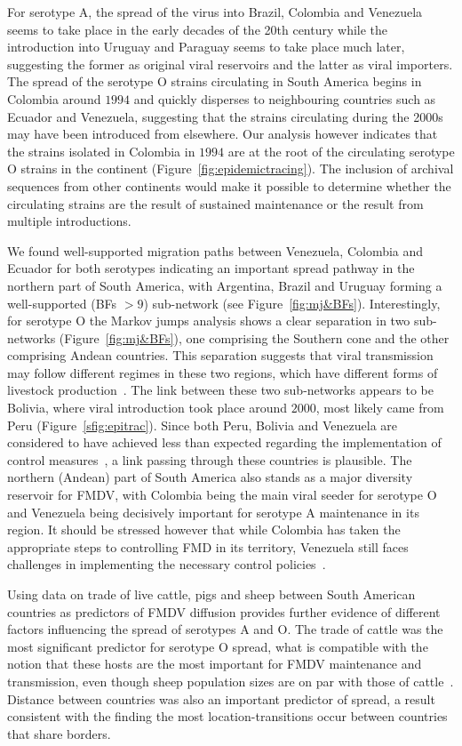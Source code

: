 \documentclass[10pt]{article}
\begin{document}
For serotype A, the spread of the virus into  Brazil, Colombia and Venezuela seems to take place in the early decades of the 20th century while the introduction into Uruguay and Paraguay seems to take place much later, suggesting the former as original viral reservoirs and the latter as viral importers.
The spread of the serotype O strains  circulating in South America begins in Colombia around $1994$ and quickly disperses to neighbouring countries such as Ecuador and Venezuela, suggesting that the strains circulating during the 2000s may have been introduced from elsewhere.
Our analysis however indicates that the strains isolated in Colombia in $1994$ are at the root of the circulating serotype O strains in the continent (Figure~\ref{fig:epidemictracing}).
The inclusion of archival sequences from other continents would make it possible to determine whether the circulating strains are the result of sustained maintenance or the result from multiple introductions. 

We found well-supported migration paths between Venezuela, Colombia and Ecuador for both serotypes indicating an important spread pathway in the northern part of South America, with Argentina, Brazil and Uruguay forming a well-supported (BFs $> 9$) sub-network (see Figure~\ref{fig:mj&BFs}).
Interestingly, for serotype O the Markov jumps analysis shows a clear separation in two sub-networks (Figure~\ref{fig:mj&BFs}), one comprising the Southern cone and the other comprising Andean countries.
This separation suggests that viral transmission may follow different regimes in these two regions, which have different forms of livestock production~\cite{Saraiva2003,Naranjo2013}.
The link between these two sub-networks appears to be Bolivia, where viral introduction took place around $2000$, most likely came from Peru (Figure~\ref{sfig:epitrac}). 
Since both Peru, Bolivia and Venezuela are considered to have achieved less than expected regarding the implementation of control measures~\cite{Naranjo2013}, a link passing through these countries is plausible.
The northern (Andean) part of South America also stands as a major diversity reservoir for FMDV, with Colombia being the main viral seeder for serotype O and Venezuela being decisively important for serotype A maintenance in its region.
It should be stressed however that while Colombia has taken the appropriate steps to controlling FMD in its territory, Venezuela still faces challenges in implementing the necessary control policies~\cite{Naranjo2013}.

Using data on trade of live cattle, pigs and sheep between South American countries as predictors of FMDV diffusion provides further evidence of different factors influencing the spread of serotypes A and O.
The trade of cattle was the most significant predictor for serotype O spread, what is compatible with the notion that these hosts are the most important for FMDV maintenance and transmission, even though sheep population sizes are on par with those of cattle~\cite{Saraiva2003}.
Distance between countries was also an important predictor of spread, a result consistent with the finding the most location-transitions occur between countries that share borders.
\end{document}
